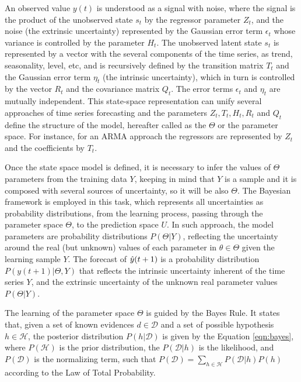 An observed value $y(t)$ is understood as a signal with noise, where the signal is the product of the unobserved state $s_t$ by the regressor parameter $Z_t$, and the noise (the extrinsic uncertainty) represented by the Gaussian error term $\epsilon_t$ whose variance is controlled by the parameter $H_t$. The unobserved latent state $s_t$ is represented by a vector with the several components of the time series, as trend, seasonality, level, etc, and is recursively defined by the transition matrix $T_t$ and the Gaussian error term $\eta_t$ (the intrinsic uncertainty), which in turn is controlled by the vector $R_t$ and the covariance matrix $Q_t$. The error terms $\epsilon_t$ and $\eta_t$ are mutually independent. This state-space representation can unify several approaches of time series forecasting and the parameters $Z_t,T_t,H_t,R_t$ and $Q_t$ define the structure of the model, hereafter called as the $\Theta$ or the parameter space. For instance, for an ARMA approach the regressors are represented by $Z_t$ and the coefficients by $T_t$. 

Once the state space model is defined, it is necessary to infer the values of $\Theta$ parameters from the training data $Y$, keeping in mind that $Y$ is a sample and it is composed with several sources of uncertainty, so it will be also $\Theta$. The Bayesian framework is employed in this task, which represents all uncertainties as probability distributions, from the learning process, passing through the parameter space $\Theta$, to the prediction space $U$. In such approach, the model parameters are probability distributions $P(\Theta|Y)$, reflecting the uncertainty around the real (but unknown) values of each parameter in $\theta \in \Theta$ given the learning sample $Y$. The forecast of $\hat{y}(t+1)$ is a probability distribution $P(y(t+1)|\Theta,Y)$ that reflects the intrinsic uncertainty inherent of the time series $Y$, and the extrinsic uncertainty of the unknown real parameter values $P(\Theta|Y)$. 

The learning of the parameter space $\Theta$ is guided by the Bayes Rule. It states that, given a set of known evidences $d \in \mathcal{D}$ and a set of possible hypothesis $h \in \mathcal{H}$, the posterior distribution $P(h|\mathcal{D})$ is given by the Equation \eqref{eqn:bayes}, where $P(\mathcal{H})$ is the prior distribution, the $P(\mathcal{D}|h)$ is the likelihood, and $P(\mathcal{D})$ is the normalizing term, such that $P(\mathcal{D}) = \sum_{h \in \mathcal{H}}P(\mathcal{D}|h)P(h)$ according to the Law of Total Probability. 

